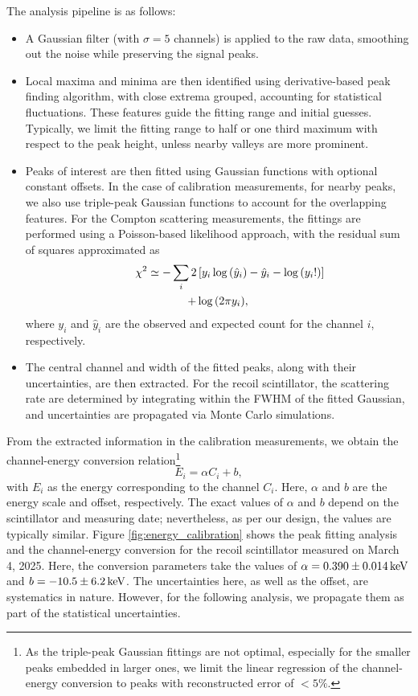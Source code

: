 \documentclass[aps,twocolumn,secnumarabic,balancelastpage,amsmath,amssymb,nofootinbib,floatfix]{revtex4-1}
\newcommand{\keV}{\,{\rm keV}}
\begin{document}
The analysis pipeline is as follows:
\begin{itemize}
    \item A Gaussian filter (with $\sigma = 5$ channels) is applied to the raw data, smoothing out the noise while preserving the signal peaks.
    \item Local maxima and minima are then identified using derivative-based peak finding algorithm, with close extrema grouped, accounting for statistical fluctuations. These features guide the fitting range and initial guesses. Typically, we limit the fitting range to half or one third maximum with respect to the peak height, unless nearby valleys are more prominent.
    \item Peaks of interest are then fitted using Gaussian functions with optional constant offsets. In the case of calibration measurements, for nearby peaks, we also use triple-peak Gaussian functions to account for the overlapping features. For the Compton scattering measurements, the fittings are performed using a Poisson-based likelihood approach, with the residual sum of squares approximated as
    \begin{multline}
        \hspace{0.75cm} \chi^2 \simeq -\sum_i 2 \left[ y_i \log{\left( \hat{y}_i \right)} - \hat{y}_i - \log{\left( y_i! \right)}\right] \\ 
        + \log{\left(2 \pi y_i\right)},
    \end{multline}
    where $y_i$ and $\hat{y}_i$ are the observed and expected count for the channel $i$, respectively.
    \item The central channel and width of the fitted peaks, along with their uncertainties, are then extracted. For the recoil scintillator, the scattering rate are determined by integrating within the FWHM of the fitted Gaussian, and uncertainties are propagated via Monte Carlo simulations.
\end{itemize}

From the extracted information in the calibration measurements, we obtain the channel-energy conversion relation\footnote{As the triple-peak Gaussian fittings are not optimal, especially for the smaller peaks embedded in larger ones, we limit the linear regression of the channel-energy conversion to peaks with reconstructed error of $< 5\%$.}
\begin{equation}
    \label{eq:energy_calibration}
    E_i = \alpha C_i + b,
\end{equation}
with $E_i$ as the energy corresponding to the channel $C_i$. Here, $\alpha$ and $b$ are the energy scale and offset, respectively. The exact values of $\alpha$ and $b$ depend on the scintillator and measuring date; nevertheless, as per our design, the values are typically similar. Figure \ref{fig:energy_calibration} shows the peak fitting analysis and the channel-energy conversion for the recoil scintillator measured on March 4, 2025. Here, the conversion parameters take the values of $\alpha = 0.390 \pm 0.014\keV$ and $b = -10.5 \pm 6.2\keV$. The uncertainties here, as well as the offset, are systematics in nature. However, for the following analysis, we propagate them as part of the statistical uncertainties.
\end{document}
